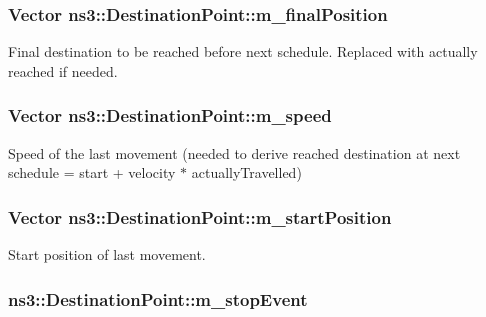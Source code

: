 \subsubsection[{\texorpdfstring{m\+\_\+final\+Position}{m_finalPosition}}]{\setlength{\rightskip}{0pt plus 5cm}Vector ns3\+::\+Destination\+Point\+::m\+\_\+final\+Position}\hypertarget{structns3_1_1DestinationPoint_a57f395e4cb80fbadc07b4526ec7740dd}{}\label{structns3_1_1DestinationPoint_a57f395e4cb80fbadc07b4526ec7740dd}


Final destination to be reached before next schedule. Replaced with actually reached if needed. 

\subsubsection[{\texorpdfstring{m\+\_\+speed}{m_speed}}]{\setlength{\rightskip}{0pt plus 5cm}Vector ns3\+::\+Destination\+Point\+::m\+\_\+speed}\hypertarget{structns3_1_1DestinationPoint_aa2aea76b64023558167a7d2c09bf618c}{}\label{structns3_1_1DestinationPoint_aa2aea76b64023558167a7d2c09bf618c}


Speed of the last movement (needed to derive reached destination at next schedule = start + velocity $\ast$ actually\+Travelled) 

\subsubsection[{\texorpdfstring{m\+\_\+start\+Position}{m_startPosition}}]{\setlength{\rightskip}{0pt plus 5cm}Vector ns3\+::\+Destination\+Point\+::m\+\_\+start\+Position}\hypertarget{structns3_1_1DestinationPoint_ab0df8a33efe4697241de3071bb74bfaf}{}\label{structns3_1_1DestinationPoint_ab0df8a33efe4697241de3071bb74bfaf}


Start position of last movement. 

\subsubsection[{\texorpdfstring{m\+\_\+stop\+Event}{m_stopEvent}}]{ ns3\+::\+Destination\+Point\+::m\+\_\+stop\+Event}\hypertarget{structns3_1_1DestinationPoint_a35b84c102d728c0c950b479cd46cec92}{}\label{structns3_1_1DestinationPoint_a35b84c102d728c0c950b479cd46cec92}


